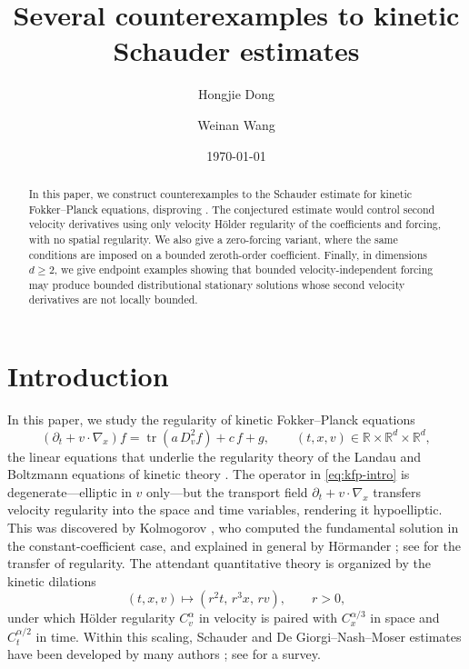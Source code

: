 \documentclass[11pt,reqno]{amsart}
\title[Counterexamples to a velocity-only kinetic Schauder estimate]{Several counterexamples to kinetic Schauder estimates}
\author{Hongjie Dong}
\author{Weinan Wang}
\date{\today}
\numberwithin{equation}{section}
\theoremstyle{remark}
\DeclareMathOperator{\tr}{tr}
\newcommand{\R}{\mathbb{R}}
\begin{document}
\begin{abstract}
In this paper, we construct counterexamples to the
Schauder estimate for kinetic Fokker--Planck equations, disproving
\cite[Conjecture~1.3]{HW}.  The conjectured estimate would control second
velocity derivatives using only velocity H\"older regularity of the
coefficients and forcing, with no spatial regularity.  We also give a zero-forcing variant, where the
same {conditions are imposed on} a bounded zeroth-order coefficient.  Finally,
in dimensions $d\geq 2$, we give endpoint examples showing that bounded
velocity-independent forcing may produce bounded distributional stationary
solutions whose second velocity derivatives are not locally bounded. 
\end{abstract}

\maketitle

\section{Introduction}

In this paper, we study the regularity of kinetic Fokker--Planck equations
\begin{equation}\label{eq:kfp-intro}
   (\partial_t+v\cdot\nabla_x)f=\tr\!\left(a\,D_v^2 f\right)+c\,f+g,
   \qquad (t,x,v)\in\R\times\R^d\times\R^d,
\end{equation}
the linear equations that underlie the regularity theory of the Landau and Boltzmann equations of kinetic theory \cite{Villani02}.  The operator in \eqref{eq:kfp-intro} is degenerate---elliptic in $v$ only---but the transport field $\partial_t+v\cdot\nabla_x$ transfers velocity regularity into the space and time variables, rendering it hypoelliptic.  This was discovered by Kolmogorov \cite{Kolmogorov}, who computed the fundamental solution in the constant-coefficient case, and explained in general by H\"ormander \cite{Hormander}; see \cite{Bouchut} for the transfer of regularity.  The attendant quantitative theory is organized by the kinetic dilations
\[
(t,x,v)\mapsto(r^2t,\,r^3x,\,rv),\qquad r>0,
\]
under which H\"older regularity $C_v^\alpha$ in velocity is paired with $C_x^{\alpha/3}$ in space and $C_t^{\alpha/2}$ in time.  Within this scaling, Schauder and De Giorgi--Nash--Moser estimates have been developed by many authors \cite{GIMV,ImbertMouhot,ImbertSilvestreSchauder,BramantiBrandolini,DiFrancescoPolidoro,Manfredini,HaoWuZhang,Zhu}; see \cite{SilvestreOpen} for a survey.
\end{document}
